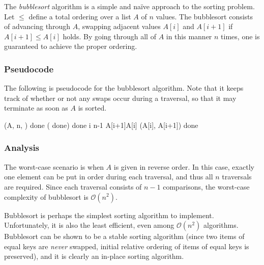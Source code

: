 \documentclass[12pt]{article}
\begin{document}
The \emph{bubblesort} algorithm is a simple and na\"ive approach to the sorting problem.  Let $\le$ define a total ordering over a list $A$ of $n$ values.
The bubblesort consists of advancing through $A$, swapping adjacent values $A[i]$ and $A[i+1]$ if $A[i+1]\le A[i]$ holds.  By going through all of $A$ in this manner $n$ times, one is guaranteed to achieve the proper ordering.

\subsubsection*{Pseudocode}

The following is pseudocode for the bubblesort algorithm.  Note that it keeps track of whether or not any swaps occur during a traversal, so that it may terminate as soon as $A$ is sorted.

\begin{program}
(A, n, \le)
done \gets {}
\WHILE ( done) \DO
  done \gets {}
  \FOR i \TO n-1 \DO
    \IF A[i+1]\le A[i]
    \THEN {}(A[i], A[i+1])
          done \gets {}
    \FI
  \OD
\OD    
\end{program}

\subsubsection*{Analysis}

The worst-case scenario is when $A$ is given in reverse order.  In this case,
exactly one element can be put in order during each traversal, and thus all $n$ traversals are required.  Since each traversal consists of $n-1$ comparisons, the worst-case complexity of bubblesort is $\mathcal{O}(n^2)$.
 
Bubblesort is perhaps the simplest sorting algorithm to implement.  Unfortunately, it is also the least efficient, even among $\mathcal{O}(n^2)$ algorithms.  Bubblesort can be shown to be a stable sorting algorithm (since two items of equal keys are \emph{never} swapped, initial relative ordering of items of equal keys is preserved), and it is clearly an in-place sorting algorithm.
\end{document}
